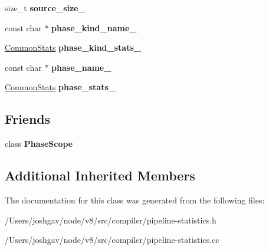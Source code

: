 \begin{DoxyCompactItemize}
\item 
size\+\_\+t {\bfseries source\+\_\+size\+\_\+}\hypertarget{classv8_1_1internal_1_1compiler_1_1_pipeline_statistics_ab0394549a2e794cadfc0321187ecb004}{}\label{classv8_1_1internal_1_1compiler_1_1_pipeline_statistics_ab0394549a2e794cadfc0321187ecb004}

\item 
const char $\ast$ {\bfseries phase\+\_\+kind\+\_\+name\+\_\+}\hypertarget{classv8_1_1internal_1_1compiler_1_1_pipeline_statistics_a898a9c08be06e83bb22dbf84f1dbedd2}{}\label{classv8_1_1internal_1_1compiler_1_1_pipeline_statistics_a898a9c08be06e83bb22dbf84f1dbedd2}

\item 
\hyperlink{classv8_1_1internal_1_1compiler_1_1_pipeline_statistics_1_1_common_stats}{Common\+Stats} {\bfseries phase\+\_\+kind\+\_\+stats\+\_\+}\hypertarget{classv8_1_1internal_1_1compiler_1_1_pipeline_statistics_a6de97447e8eab297c19de7e73209046d}{}\label{classv8_1_1internal_1_1compiler_1_1_pipeline_statistics_a6de97447e8eab297c19de7e73209046d}

\item 
const char $\ast$ {\bfseries phase\+\_\+name\+\_\+}\hypertarget{classv8_1_1internal_1_1compiler_1_1_pipeline_statistics_add14aa9798510de3eb4c86009920dbea}{}\label{classv8_1_1internal_1_1compiler_1_1_pipeline_statistics_add14aa9798510de3eb4c86009920dbea}

\item 
\hyperlink{classv8_1_1internal_1_1compiler_1_1_pipeline_statistics_1_1_common_stats}{Common\+Stats} {\bfseries phase\+\_\+stats\+\_\+}\hypertarget{classv8_1_1internal_1_1compiler_1_1_pipeline_statistics_a71b7f4ce8ce3dfa699399f9c89cb9665}{}\label{classv8_1_1internal_1_1compiler_1_1_pipeline_statistics_a71b7f4ce8ce3dfa699399f9c89cb9665}

\end{DoxyCompactItemize}
\subsection*{Friends}
\begin{DoxyCompactItemize}
\item 
class {\bfseries Phase\+Scope}\hypertarget{classv8_1_1internal_1_1compiler_1_1_pipeline_statistics_a83107872a2da1a6ff69a6f49d40dabbe}{}\label{classv8_1_1internal_1_1compiler_1_1_pipeline_statistics_a83107872a2da1a6ff69a6f49d40dabbe}

\end{DoxyCompactItemize}
\subsection*{Additional Inherited Members}


The documentation for this class was generated from the following files\+:\begin{DoxyCompactItemize}
\item 
/\+Users/joshgav/node/v8/src/compiler/pipeline-\/statistics.\+h\item 
/\+Users/joshgav/node/v8/src/compiler/pipeline-\/statistics.\+cc\end{DoxyCompactItemize}
